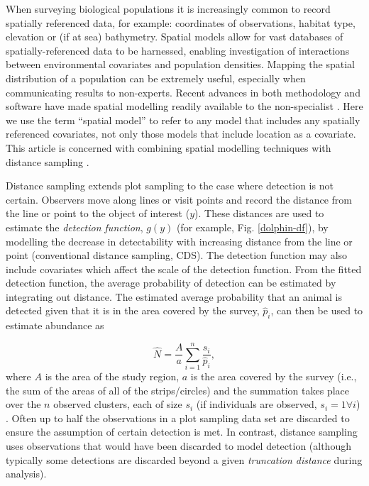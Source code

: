 \documentclass[a4paper,12pt]{article}
\begin{document}
When surveying biological populations it is increasingly common to record spatially referenced data, for example: coordinates of observations, habitat type, elevation or (if at sea) bathymetry. Spatial models allow for vast databases of spatially-referenced data \citep[e.g. OBIS-SEAMAP,][]{Halpin:2009je} to be harnessed, enabling investigation of interactions between environmental covariates and population densities. Mapping the spatial distribution of a population can be extremely useful, especially when communicating results to non-experts. Recent advances in both methodology and software have made spatial modelling readily available to the non-specialist \citep[e.g.,][]{Wood:2006wz, Rue:2009tw}. Here we use the term ``spatial model'' to refer to any model that includes any spatially referenced covariates, not only those models that include location as a covariate. This article is concerned with combining spatial modelling techniques with distance sampling \citep{Buckland:2001vm, Buckland:2004ts}. 

Distance sampling extends plot sampling to the case where detection is not certain. Observers move along lines or visit points and record the distance from the line or point to the object of interest ($y$). These distances are used to estimate the \textit{detection function}, $g(y)$ (for example, Fig. \ref{dolphin-df}), by modelling the decrease in detectability with increasing distance from the line or point (conventional distance sampling, CDS). The detection function may also include covariates \citep[multiple covariate distance sampling, MCDS;][]{Marques:2007vm} which affect the scale of the detection function. From the fitted detection function, the average probability of detection can be estimated by integrating out distance. The estimated average probability that an animal is detected given that it is in the area covered by the survey, $\hat{p}_i$, can then be used to estimate abundance as

\begin{equation}
\hat{N} = \frac{A}{a} \sum_{i=1}^{n} \frac{s_i}{\hat{p}_i},
\label{ht-est}
\end{equation}
where $A$ is the area of the study region, $a$ is the area covered by the survey (i.e., the sum of the areas of all of the strips/circles) and the summation takes place over the $n$ observed clusters, each of size $s_i$ (if individuals are observed, $s_i=1 \forall i$) \citep[Chapter 3]{Buckland:2001vm}. Often up to half the observations in a plot sampling data set are discarded to ensure the assumption of certain detection is met. In contrast, distance sampling uses observations that would have been discarded to model detection (although typically some detections are discarded beyond a given \textit{truncation distance} during analysis).
\end{document}
